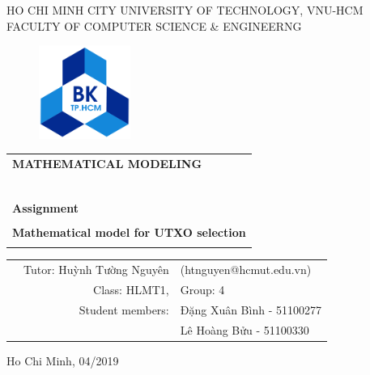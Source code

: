 \documentclass[a4paper]{article}
\begin{document}
\begin{titlepage}

\begin{center}
HO CHI MINH CITY UNIVERSITY OF TECHNOLOGY, VNU-HCM\\
FACULTY OF COMPUTER SCIENCE \& ENGINEERNG
\end{center}

\vspace{1cm}

\begin{figure}[h!]
\begin{center}
\includegraphics[width=3cm]{hcmut.png}
\end{center}
\end{figure}

\vspace{1cm}


\begin{center}
\begin{tabular}{c}
\multicolumn{1}{l}{\textbf{{\Large MATHEMATICAL MODELING}}}\\
~~\\
\hline
\\
\multicolumn{1}{l}{\textbf{{\Large Assignment}}}\\
\\
\textbf{\Huge Mathematical model for UTXO selection}\\
\\
\hline
\end{tabular}
\end{center}

\vspace{3cm}

\begin{table}[h]
\begin{tabular}{rrl}

\hspace{5 cm} & Tutor: Huỳnh Tường Nguyên & (htnguyen@hcmut.edu.vn)\\
& Class: HLMT1, & Group: 4\\
& Student members: & Đặng Xuân Bình - 51100277 \\
& & Lê Hoàng Bửu - 51100330 \\

\end{tabular}
\end{table}

\begin{center}
{\footnotesize Ho Chi Minh, 04/2019}
\end{center}
\end{titlepage}
\end{document}
